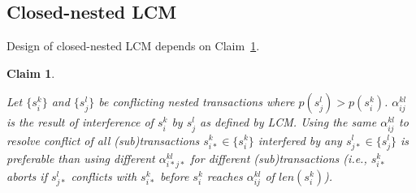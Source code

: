 \documentclass[10pt, conference, compsocconf]{IEEEtran}
\newtheorem{clm}{Claim}
\begin{document}
\subsection{Closed-nested LCM}\label{sec:closed_nested_lcm}

Design of closed-nested LCM depends on Claim~\ref{closed_nesting_fblt_one_alpha}.

\begin{clm}\label{closed_nesting_fblt_one_alpha}

Let $\{s_{i}^{k}\}$ and $\{s_{j}^{l}\}$ be conflicting nested transactions where $p(s_{j}^{l})>p(s_{i}^{k})$. $\alpha_{ij}^{kl}$ is the result of interference of $s_{i}^{k}$ by $s_{j}^{l}$ as defined by LCM. Using the same $\alpha_{ij}^{kl}$ to resolve conflict of
all (sub)transactions $s_{i*}^{k}\in\{s_{i}^{k}\}$ interfered by
any $s_{j*}^{l}\in\{s_{j}^{l}\}$ is preferable than using different
$\alpha_{i*j*}^{kl}$ for different (sub)transactions (i.e., $s_{i*}^{k}$
aborts if $s_{j*}^{l}$ conflicts with $s_{i*}^{k}$ before $s_{i}^{k}$
reaches $\alpha_{ij}^{kl}$ of $len(s_{i}^{k})$).

\end{clm}
\end{document}
